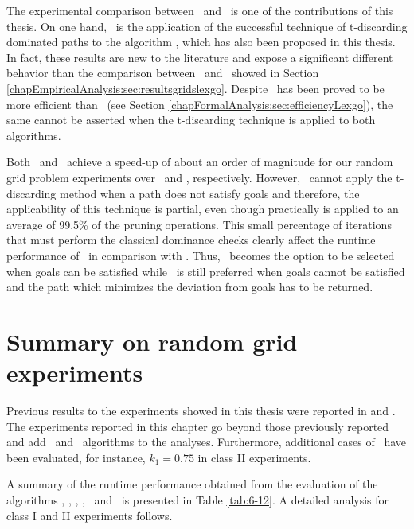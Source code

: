 The experimental comparison between \namoate \ and \lexgote \ is one of the contributions of this thesis. On one hand, \lexgote \ is the application of the successful technique of t-discarding dominated paths to the algorithm \lexgo, which has also been proposed in this thesis. In fact, these results are new to the literature and expose a significant different behavior than the comparison between \lexgo \ and \namoa \ showed in Section \ref{chapEmpiricalAnalysis:sec:resultsgridslexgo}. Despite \lexgo \ has been proved to be more efficient than \namoa \ (see Section \ref{chapFormalAnalysis:sec:efficiencyLexgo}), the same cannot be asserted when the t-discarding technique is applied to both algorithms. 

Both \namoate \ and \lexgote \ achieve a speed-up of about an order of magnitude for our random grid problem experiments over \namoa \ and \lexgo, respectively. However, \lexgote \ cannot apply the t-discarding method when a path does not satisfy goals and therefore, the applicability of this technique is partial, even though practically is applied to an average of 99.5\% of the pruning operations. This small percentage of iterations that must perform the classical dominance checks clearly affect the runtime performance of \lexgote \ in comparison with \namoate. Thus, \namoate \ becomes the option to be selected when goals can be satisfied while \lexgote \ is still preferred when goals cannot be satisfied and the path which minimizes the deviation from goals has to be returned.      

\section{Summary on random grid experiments}
\label{chapEmpiricalAnalysis:sec:summarygridsfinal}

Previous results to the experiments showed in this thesis were reported in \citet{Pulido2014} and \citet{Pulido2015}. The experiments reported in this chapter go beyond those previously reported and add \lexgolin \ and \lexgote \ algorithms to the analyses. Furthermore, additional cases of \lexgo \ have been evaluated, for instance, $k_1=0.75$ in class II experiments. 

A summary of the runtime performance obtained from the evaluation of the algorithms \namoalex, \namoalin, \lexgolex, \lexgolin, \namoate \ and \lexgote \
is presented in Table \ref{tab:6-12}. A detailed analysis for class I and II experiments follows. 

